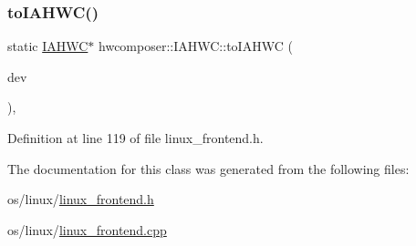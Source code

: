 \subsubsection{\texorpdfstring{to\+I\+A\+H\+W\+C()}{toIAHWC()}}
{\footnotesize\ttfamily static \mbox{\hyperlink{classhwcomposer_1_1IAHWC}{I\+A\+H\+WC}}$\ast$ hwcomposer\+::\+I\+A\+H\+W\+C\+::to\+I\+A\+H\+WC (\begin{DoxyParamCaption}\item[{\mbox{\hyperlink{iahwc_8h_aa44e63a48d7c328d160f28888a6b3edd}{iahwc\+\_\+device\+\_\+t}} $\ast$}]{dev }\end{DoxyParamCaption})\hspace{0.3cm}{\ttfamily [inline]}, {\ttfamily [static]}}



Definition at line 119 of file linux\+\_\+frontend.\+h.


\begin{DoxyCode}{0}
\end{DoxyCode}


The documentation for this class was generated from the following files\+:\begin{DoxyCompactItemize}
\item 
os/linux/\mbox{\hyperlink{linux__frontend_8h}{linux\+\_\+frontend.\+h}}\item 
os/linux/\mbox{\hyperlink{linux__frontend_8cpp}{linux\+\_\+frontend.\+cpp}}\end{DoxyCompactItemize}
